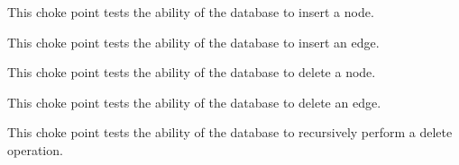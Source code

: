 
This choke point tests the ability of the database to insert a node.





This choke point tests the ability of the database to insert an edge.





This choke point tests the ability of the database to delete a node.





This choke point tests the ability of the database to delete an edge.





This choke point tests the ability of the database to recursively perform a delete operation.


